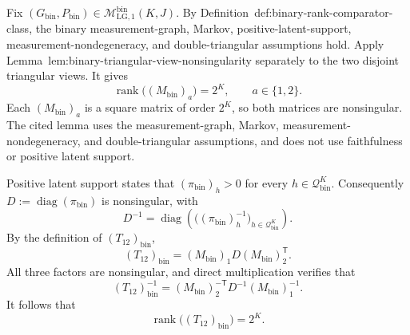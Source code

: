 Fix \((G_{\mathrm{bin}},P_{\mathrm{bin}})\in
\mathcal M_{\mathrm{LG},1}^{\mathrm{bin}}(K,J)\).  By
Definition~\textnormal{def:binary-rank-comparator-class}, the binary
measurement-graph, Markov, positive-latent-support,
measurement-nondegeneracy, and double-triangular assumptions hold.  Apply
Lemma~\textnormal{lem:binary-triangular-view-nonsingularity} separately to
the two disjoint triangular views.  It gives
\[
 \operatorname{rank}\bigl((M_{\mathrm{bin}})_a\bigr)=2^K,
 \qquad a\in\{1,2\}.
\]
Each \((M_{\mathrm{bin}})_a\) is a square matrix of order \(2^K\), so both
matrices are nonsingular.  The cited lemma uses the measurement-graph,
Markov, measurement-nondegeneracy, and double-triangular assumptions, and
does not use faithfulness or positive latent support.

Positive latent support states that
\((\pi_{\mathrm{bin}})_h>0\) for every
\(h\in\mathcal Q_{\mathrm{bin}}^K\).  Consequently
\(D:=\operatorname{diag}(\pi_{\mathrm{bin}})\) is nonsingular, with
\[
 D^{-1}=\operatorname{diag}
 \left(\bigl((\pi_{\mathrm{bin}})_h^{-1}\bigr)_
 {h\in\mathcal Q_{\mathrm{bin}}^K}\right).
\]
By the definition of \((T_{12})_{\mathrm{bin}}\),
\[
 (T_{12})_{\mathrm{bin}}
 =(M_{\mathrm{bin}})_1D(M_{\mathrm{bin}})_2^{\mathsf T}.
\]
All three factors are nonsingular, and direct multiplication verifies that
\[
 (T_{12})_{\mathrm{bin}}^{-1}
 =(M_{\mathrm{bin}})_2^{-\mathsf T}D^{-1}
  (M_{\mathrm{bin}})_1^{-1}.
\]
It follows that
\[
 \operatorname{rank}\bigl((T_{12})_{\mathrm{bin}}\bigr)=2^K.
\]

